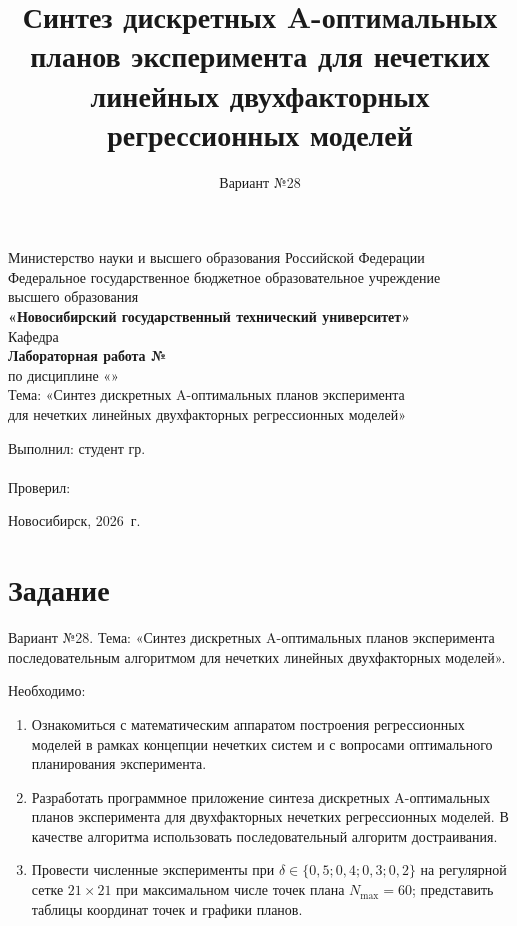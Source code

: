 \documentclass[a4paper,12pt]{article}
\title{Синтез дискретных A-оптимальных планов эксперимента
для нечетких линейных двухфакторных регрессионных моделей}
\author{Вариант №28}
\date{}
\begin{document}
\begin{titlepage}
  \begin{center}
    Министерство науки и высшего образования Российской Федерации\\
    Федеральное государственное бюджетное образовательное учреждение\\
    высшего образования\\[0.5cm]
    \textbf{«Новосибирский государственный технический университет»}\\[2cm]

    Кафедра \underline{\hspace{6cm}}\\[3cm]

    \textbf{Лабораторная работа №\,\underline{\hspace{1cm}}}\\[0.5cm]
    по дисциплине «\underline{\hspace{5cm}}»\\[0.5cm]
    Тема: «Синтез дискретных A-оптимальных планов эксперимента\\
    для нечетких линейных двухфакторных регрессионных моделей»\\[3cm]

    \begin{flushright}
      Выполнил: студент гр. \underline{\hspace{2cm}}\\
      \underline{\hspace{5cm}}\\[0.5cm]
      Проверил: \underline{\hspace{5cm}}\\
    \end{flushright}

    \vfill
    Новосибирск, 2026~г.
  \end{center}
\end{titlepage}

\section{Задание}

Вариант №28. Тема: «Синтез дискретных A-оптимальных планов эксперимента
последовательным алгоритмом для нечетких линейных двухфакторных моделей».

Необходимо:
\begin{enumerate}
  \item Ознакомиться с математическим аппаратом построения регрессионных моделей
        в рамках концепции нечетких систем и с вопросами оптимального
        планирования эксперимента.
  \item Разработать программное приложение синтеза дискретных A-оптимальных
        планов эксперимента для двухфакторных нечетких регрессионных моделей.
        В качестве алгоритма использовать последовательный алгоритм достраивания.
  \item Провести численные эксперименты при
        $\delta \in \{0{,}5; 0{,}4; 0{,}3; 0{,}2\}$ на регулярной сетке $21\times 21$
        при максимальном числе точек плана $N_{\max}=60$; представить
        таблицы координат точек и графики планов.
\end{enumerate}
\end{document}
